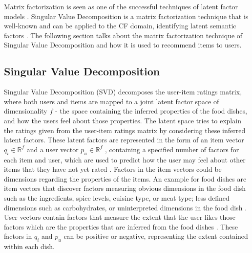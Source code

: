 Matrix factorization is seen as one of the successful techniques of latent factor models \cite{koren2009matrix}. Singular Value Decomposition is a matrix factorization technique that is well-known and can be applied to the CF domain, identifying latent semantic factors \cite{koren2009matrix}. The following section talks about the matrix factorization technique of Singular Value Decomposition and how it is used to recommend items to users. 


\subsection{Singular Value Decomposition}

Singular Value Decomposition (SVD) decomposes the user-item ratings matrix, where both users and items are mapped to a joint latent factor space of dimensionality \begin{math} f \end{math} - the space containing the inferred properties of the food dishes, and how the users feel about those properties. The latent space tries to explain the ratings given from the user-item ratings matrix by considering these inferred latent factors. These latent factors are represented in the form of an item vector \begin{math} q_{i} \in \mathbb{R}^f  \end{math} and a user vector \begin{math} p_{u} \in \mathbb{R}^f  \end{math} , containing a specified number of factors for each item and user, which are used to predict how the user may feel about other items that they have not yet rated \cite{koren2009matrix}. Factors in the item vectors could be dimensions regarding the properties of the items. An example for food dishes are item vectors that discover factors measuring obvious dimensions in the food dish such as the ingredients, spice levels, cuisine type, or meat type; less defined dimensions such as carbohydrates, or uninterpreted dimensions in the food dish \cite{koren2009matrix}. User vectors contain factors that measure the extent that the user likes those factors which are the properties that are inferred from the food dishes \cite{koren2009matrix}. These factors in \begin{math} q_{i} \end{math} and \begin{math} p_{u} \end{math} can be positive or negative, representing the extent contained within each dish. 

